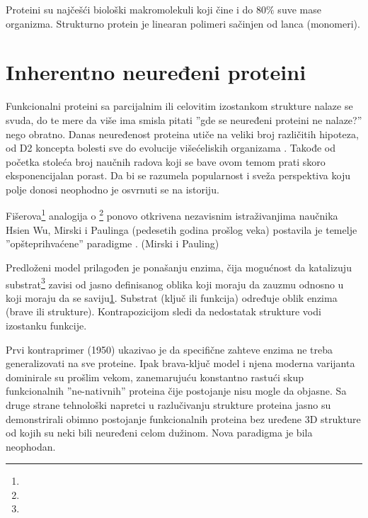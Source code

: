 Proteini su najčešći biološki makromolekuli koji čine i do $80\%$ suve mase
organizma.  Strukturno protein je linearan polimeri sačinjen od lanca
(monomeri). 


\section{Inherentno neuređeni proteini}

Funkcionalni proteini sa parcijalnim ili celovitim izostankom strukture nalaze
se svuda, do te mere da više ima smisla pitati ''gde se neuređeni proteini ne
nalaze?'' nego obratno\parencite{uversky2016}. Danas neuređenost proteina utiče
na veliki broj različitih hipoteza, od D2\parencite{} koncepta bolesti sve do
evolucije višećeliskih organizama \parencite{uversky2016}. Takođe od početka
stoleća broj naučnih radova koji se bave ovom temom prati skoro eksponencijalan
porast\parencite{oldfield2014}.  Da bi se razumela popularnost i sveža
perspektiva koju polje donosi neophodno je osvrnuti se na istoriju.

Fišerova\footnote{
} analogija o \footnote{
} ponovo otkrivena nezavisnim
istraživanjima naučnika Hsien Wu,  Mirski i Paulinga (pedesetih godina prošlog
veka) postavila je temelje ''opšteprihvaćene'' 
paradigme \parencite{dunker2001}.
 (Mirski i Pauling)

Predloženi model prilagođen je ponašanju enzima, čija mogućnost da katalizuju
substrat\footnote{} zavisi od jasno definisanog oblika koji moraju da zauzmu
odnosno u koji moraju da se saviju\ref{}. Substrat (ključ ili funkcija) određuje
oblik enzima (brave ili strukture). Kontrapozicijom sledi da nedostatak
strukture vodi izostanku funkcije.

Prvi kontraprimer  (1950) ukazivao je da specifične
zahteve enzima ne treba generalizovati na sve proteine. Ipak brava-ključ model
i njena moderna varijanta  dominirale su prošlim vekom,
zanemarujuću konstantno rastući skup funkcionalnih ''ne-nativnih'' proteina
čije postojanje nisu mogle da objasne. Sa druge strane tehnološki napretci u
razlučivanju strukture proteina jasno su demonstrirali obimno postojanje
funkcionalnih proteina bez uređene 3D strukture od kojih su neki bili neuređeni
celom dužinom\parencite{dunker2001}.
Nova paradigma je bila neophodan.

